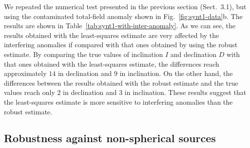 \documentclass[journal abbreviation, npg]{copernicus}
\begin{document}
We repeated the numerical test presented in the previous section (Sect.~3.1),
but using the contaminated total-field anomaly shown in
Fig.~\ref{fig:synt1-data}b. The results are shown in
Table~\ref{tab:synt1-with-inter-anomaly}. As we can see, the results obtained
with the least-squares estimate are very affected by the interfering
anomalies if compared with that ones obtained by using the robust estimate.
By comparing the true values of inclination $I$ and declination $D$ with that
ones obtained with the least-squares estimate, the differences reach
approximately $14${\degree} in declination and $9${\degree} in inclination.
On the other hand, the differences between the results obtained with the
robust estimate and the true values reach only $2${\degree} in declination
and $3${\degree} in inclination. These results suggest that the least-squares
estimate is more sensitive to interfering anomalies than the robust estimate.

\subsection{Robustness against non-spherical sources}
\end{document}

